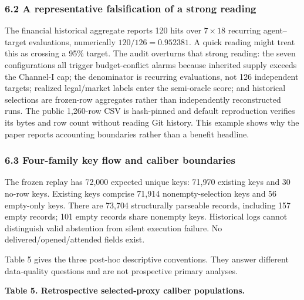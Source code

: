 \documentclass[
  11pt]{article}
\begin{document}
\subsubsection{6.2 A representative falsification of a strong
reading}\label{a-representative-falsification-of-a-strong-reading}

The financial historical aggregate reports 120 hits over \(7\times18\)
recurring agent--target evaluations, numerically \(120/126=0.952381\). A
quick reading might treat this as crossing a 95\% target. The audit
overturns that strong reading: the seven configurations all trigger
budget-conflict alarms because inherited supply exceeds the Channel-I
cap; the denominator is recurring evaluations, not 126 independent
targets; realized legal/market labels enter the semi-oracle score; and
historical selections are frozen-row aggregates rather than
independently reconstructed runs. The public 1,260-row CSV is
hash-pinned and default reproduction verifies its bytes and row count
without reading Git history. This example shows why the paper reports
accounting boundaries rather than a benefit headline.

\subsubsection{6.3 Four-family key flow and caliber
boundaries}\label{four-family-key-flow-and-caliber-boundaries}

The frozen replay has 72,000 expected unique keys: 71,970 existing keys
and 30 no-row keys. Existing keys comprise 71,914 nonempty-selection
keys and 56 empty-only keys. There are 73,704 structurally parseable
records, including 157 empty records; 101 empty records share nonempty
keys. Historical logs cannot distinguish valid abstention from silent
execution failure. No delivered/opened/attended fields exist.

Table 5 gives the three post-hoc descriptive conventions. They answer
different data-quality questions and are not prospective primary
analyses.

\textbf{Table 5. Retrospective selected-proxy caliber populations.}
\end{document}
